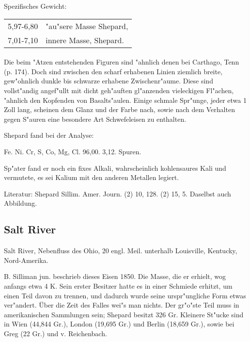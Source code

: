 \documentclass[a4paper, 11pt, oneside]{article}
\begin{document}
Spezifisches Gewicht:  
\begin{table}[!ht]
    \centering
    \begin{tabular}{l l}
        5,97-6,80 & "au"sere Masse Shepard,\\
        7,01-7,10 & innere Masse, Shepard.
    \end{tabular}
\end{table}
\paragraph{}
Die beim "Atzen entstehenden Figuren sind "ahnlich denen bei Carthago, Tenn (p. 174). Doch sind zwischen den scharf erhabenen Linien ziemlich breite, gew"ohnlich dunkle bis schwarze erhabene Zwischenr"aume. Diese sind vollst"andig angef"ullt mit dicht geh"auften gl"anzenden vieleckigen Fl"achen, "ahnlich den Kopfenden von Basalts"aulen. Einige schmale Spr"unge, jeder etwa 1 Zoll lang, scheinen dem Glanz und der Farbe nach, sowie nach dem Verhalten gegen S"auren eine besondere Art Schwefeleisen zu enthalten.

Shepard fand bei der Analyse:

Fe. Ni. Cr, S, Co, Mg, Cl.
96,00. 3,12. Spuren.

Sp"ater fand er noch ein fixes Alkali, wahrscheinlich kohlensaures Kali und vermutete, es sei Kalium mit den anderen Metallen legiert.

Literatur: Shepard Sillim. Amer. Journ. (2) 10, 128. (2) 15, 5. Daselbst auch Abbildung.

\subsection{Salt River}
\normalsize
\paragraph{}
Salt River, Nebenfluss des Ohio, 20 engl. Meil. unterhalb Louisville, Kentucky, Nord-Amerika.

B. Silliman jun. beschrieb dieses Eisen 1850. Die Masse, die er erhielt, wog anfangs etwa 4 K. Sein erster Besitzer hatte es in einer Schmiede erhitzt, um einen Teil davon zu trennen, und dadurch wurde seine urspr"ungliche Form etwas ver"andert. Über die Zeit des Falles wei"s man nichts. Der gr"o"ste Teil muss in amerikanischen Sammlungen sein; Shepard besitzt 326 Gr. Kleinere St"ucke sind in Wien (44,844 Gr.), London (19,695 Gr.) und Berlin (18,659 Gr.), sowie bei Greg (22 Gr.) und v. Reichenbach.
\end{document}
